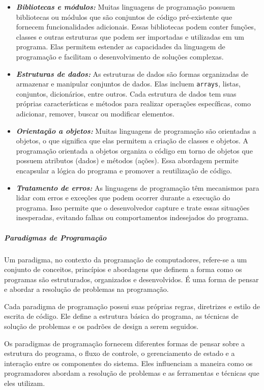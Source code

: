 \documentclass[a4paper, 12pt, onecolumn,singlespacing]{article}
\begin{document}
\begin{itemize}
		\item \textbf{\textit{Bibliotecas e módulos:}} Muitas linguagens de programação possuem bibliotecas ou módulos que são conjuntos de código pré-existente que fornecem funcionalidades adicionais. Essas bibliotecas podem conter funções, classes e outras estruturas que podem ser importadas e utilizadas em um programa. Elas permitem estender as capacidades da linguagem de programação e facilitam o desenvolvimento de soluções complexas.
		
		\item \textbf{\textit{Estruturas de dados:}} As estruturas de dados são formas organizadas de armazenar e manipular conjuntos de dados. Elas incluem \texttt{arrays}, listas, conjuntos, dicionários, entre outros. Cada estrutura de dados tem suas próprias características e métodos para realizar operações específicas, como adicionar, remover, buscar ou modificar elementos.
		
		\item \textbf{\textit{Orientação a objetos:}} Muitas linguagens de programação são orientadas a objetos, o que significa que elas permitem a criação de classes e objetos. A programação orientada a objetos organiza o código em torno de objetos que possuem atributos (dados) e métodos (ações). Essa abordagem permite encapsular a lógica do programa e promover a reutilização de código.
		
		\item \textbf{\textit{Tratamento de erros:}} As linguagens de programação têm mecanismos para lidar com erros e exceções que podem ocorrer durante a execução do programa. Isso permite que o desenvolvedor capture e trate essas situações inesperadas, evitando falhas ou comportamentos indesejados do programa.
		
	\end{itemize}
	
	\subparagraph{Paradigmas de Programação} \label{paradigmas_de_programacao} Um paradigma, no contexto da programação de computadores, refere-se a um conjunto de conceitos, princípios e abordagens que definem a forma como os programas são estruturados, organizados e desenvolvidos. É uma forma de pensar e abordar a resolução de problemas na programação.
	
	Cada paradigma de programação possui suas próprias regras, diretrizes e estilo de escrita de código. Ele define a estrutura básica do programa, as técnicas de solução de problemas e os padrões de design a serem seguidos.
	
	Os paradigmas de programação fornecem diferentes formas de pensar sobre a estrutura do programa, o fluxo de controle, o gerenciamento de estado e a interação entre os componentes do sistema. Eles influenciam a maneira como os programadores abordam a resolução de problemas e as ferramentas e técnicas que eles utilizam.
	
\end{document}
